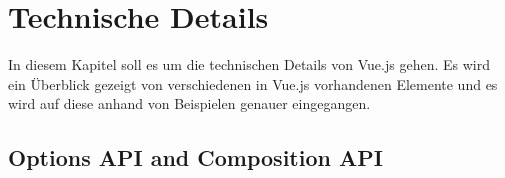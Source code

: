 
\chapter{Technische Details}
In diesem Kapitel soll es um die technischen Details von Vue.js gehen.
Es wird ein Überblick gezeigt von verschiedenen in Vue.js vorhandenen Elemente
und es wird auf diese anhand von Beispielen genauer eingegangen.

\section{Options API and Composition API}\label{sec:options-api-and-composition-api}
